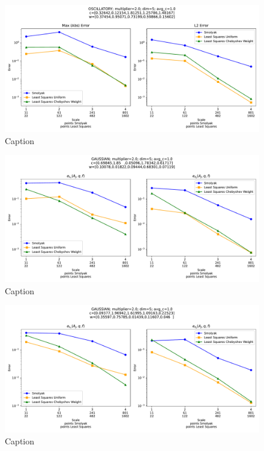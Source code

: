 \documentclass[12pt, oneside]{amsart}
\theoremstyle{definition}
\theoremstyle{remark}
\numberwithin{equation}{section}
\begin{document}
\begin{figure}[H]
	\centering
	\includegraphics[width=\linewidth]{figures/oscillatory/realization1_dim5_scale4.pdf}
	\caption{Caption}
	\label{fig:Osc_1_dim5_scale4}
\end{figure}

\begin{figure}[H]
	\centering
	\includegraphics[width=\linewidth]{figures/oscillatory/realization2_dim5_scale4.pdf}
	\caption{Caption}
	\label{fig:Osc_2_dim5_scale4}
\end{figure}

\begin{figure}[H]
	\centering
	\includegraphics[width=\linewidth]{figures/oscillatory/realization3_dim5_scale4.pdf}
	\caption{Caption}
	\label{fig:Osc_3_dim5_scale4}
\end{figure}
\end{document}
